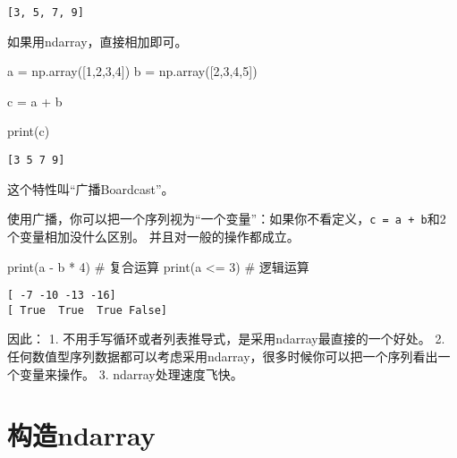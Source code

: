 \documentclass[
  letterpaper,
  DIV=11,
  numbers=noendperiod]{scrreprt}
\newenvironment{Shaded}{\begin{snugshade}}{\end{snugshade}}
\newcommand{\BuiltInTok}[1]{\textcolor[rgb]{0.00,0.23,0.31}{#1}}
\newcommand{\CommentTok}[1]{\textcolor[rgb]{0.37,0.37,0.37}{#1}}
\newcommand{\DecValTok}[1]{\textcolor[rgb]{0.68,0.00,0.00}{#1}}
\newcommand{\NormalTok}[1]{\textcolor[rgb]{0.00,0.23,0.31}{#1}}
\newcommand{\OperatorTok}[1]{\textcolor[rgb]{0.37,0.37,0.37}{#1}}
\begin{document}
\begin{verbatim}
[3, 5, 7, 9]
\end{verbatim}

如果用ndarray，直接相加即可。

\begin{Shaded}
\begin{Highlighting}[]
\NormalTok{a }\OperatorTok{=}\NormalTok{ np.array([}\DecValTok{1}\NormalTok{,}\DecValTok{2}\NormalTok{,}\DecValTok{3}\NormalTok{,}\DecValTok{4}\NormalTok{])}
\NormalTok{b }\OperatorTok{=}\NormalTok{ np.array([}\DecValTok{2}\NormalTok{,}\DecValTok{3}\NormalTok{,}\DecValTok{4}\NormalTok{,}\DecValTok{5}\NormalTok{])}

\NormalTok{c }\OperatorTok{=}\NormalTok{ a }\OperatorTok{+}\NormalTok{ b}

\BuiltInTok{print}\NormalTok{(c)}
\end{Highlighting}
\end{Shaded}

\begin{verbatim}
[3 5 7 9]
\end{verbatim}

这个特性叫``广播Boardcast''。

使用广播，你可以把一个序列视为``一个变量''：如果你不看定义，\texttt{c\ =\ a\ +\ b}和2个变量相加没什么区别。
并且对一般的操作都成立。

\begin{Shaded}
\begin{Highlighting}[]
\BuiltInTok{print}\NormalTok{(a }\OperatorTok{{-}}\NormalTok{ b }\OperatorTok{*} \DecValTok{4}\NormalTok{) }\CommentTok{\# 复合运算}
\BuiltInTok{print}\NormalTok{(a }\OperatorTok{\textless{}=} \DecValTok{3}\NormalTok{) }\CommentTok{\# 逻辑运算}
\end{Highlighting}
\end{Shaded}

\begin{verbatim}
[ -7 -10 -13 -16]
[ True  True  True False]
\end{verbatim}

因此： 1. 不用手写循环或者列表推导式，是采用ndarray最直接的一个好处。 2.
任何数值型序列数据都可以考虑采用ndarray，很多时候你可以把一个序列看出一个变量来操作。
3. ndarray处理速度飞快。

\hypertarget{ux6784ux9020ndarray}{%
\section{构造ndarray}\label{ux6784ux9020ndarray}}
\end{document}
